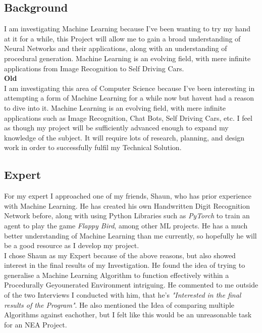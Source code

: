 \begin{flushleft}
        \subsection{Background}
            \vspace{0.2cm}
            I am investigating Machine Learning because I've been wanting to try my hand at it for a while, this Project
            will allow me to gain a broad understanding of Neural Networks and their applications, along with an understanding
            of procedural generation. Machine Learning is an evolving field, with mere infinite applications from Image Recognition
            to Self Driving Cars. \\
            \vspace{0.2cm}
            \textbf{Old} \\ 
            I am investigating this area of Computer Science because I've been interesting in attempting a form of
            Machine Learning for a while now but havent had a reason to dive into it. Machine Learning is an evolving
            field, with mere infinite applications such as Image Recognition, Chat Bots, Self Driving Cars, 
            etc. I feel as though my project will be sufficiently advanced enough to expand my knowledge of the subject.
            It will require lots of research, planning, and design work in order to successfully fulfil my Technical
            Solution. \\

            \vspace{0.2cm}
        \subsection{Expert}
            \vspace{0.2cm}
            For my expert I approached one of my friends, Shaun, who has prior experience with Machine Learning. He has
            created his own Handwritten Digit Recognition Network before, along with using Python Libraries such as 
            \textit{PyTorch} to train an agent to play the game \textit{Flappy Bird}, among other ML projects. He has 
            a much better understanding of Machine Learning than me currently, so hopefully he will be a good resource 
            as I develop my project. \\
            \vspace{0.2cm}    
            I chose Shaun as my Expert because of the above reasons, but also showed interest
            in the final results of my Investigation. He found the idea of trying to generalise a Machine Learning Algorithm
            to function effectively within a Procedurally Geyounerated Environment intriguing. He commented to me outside of the
            two Interviews I conducted with him, that he's \textit{"Interested in the final results of the Program"}. He also
            mentioned the Idea of comparing multiple Algorithms against eachother, but I felt like this would be an unreasonable
            task for an NEA Project. \\
            \vspace{0.2cm}    

\end{flushleft}

